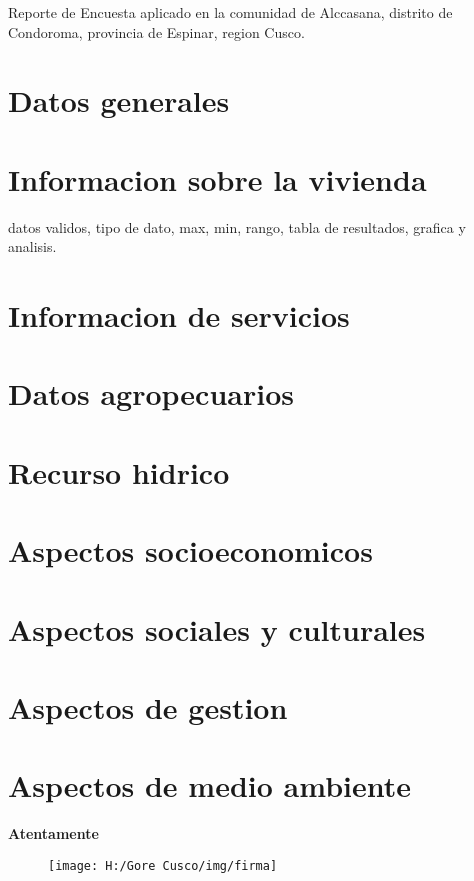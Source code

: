 




	\begin{titlepage}
		Reporte de Encuesta aplicado en la comunidad de Alccasana, distrito de Condoroma, provincia de Espinar, region Cusco.
	\end{titlepage}
	\section{Datos generales}
	\section{Informacion sobre la vivienda}
	datos validos, tipo de dato, max, min, rango, tabla de resultados, grafica y analisis.
	
	
	\section{Informacion de servicios}
	\section{Datos agropecuarios}
	\section{Recurso hidrico}
	\section{Aspectos socioeconomicos}
	\section{Aspectos sociales y culturales}
	\section{Aspectos de gestion}
	\section{Aspectos de medio ambiente}
	\begin{center}
		\textbf{Atentamente}
	\end{center}
	\begin{figure}[H]
		\centering
		\texttt{[image: H:/Gore Cusco/img/firma]}
	\end{figure}
	\thispagestyle{lastpage}

